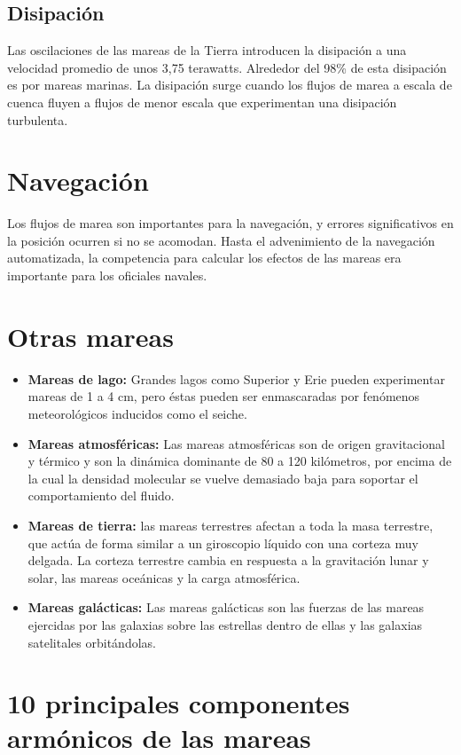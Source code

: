 \documentclass[12pt]{article}
\begin{document}
\begin{doublespace}
\subsection*{Disipación}
Las oscilaciones de las mareas de la Tierra introducen la disipación a una velocidad promedio de unos 3,75 terawatts. Alrededor del 98\% de esta disipación es por mareas marinas. La disipación surge cuando los flujos de marea a escala de cuenca fluyen a flujos de menor escala que experimentan una disipación turbulenta.

\section*{Navegación}
Los flujos de marea son importantes para la navegación, y errores significativos en la posición ocurren si no se acomodan. Hasta el advenimiento de la navegación automatizada, la competencia para calcular los efectos de las mareas era importante para los oficiales navales.

\section*{Otras mareas}
\begin{itemize}
\item \textbf{Mareas de lago:} Grandes lagos como Superior y Erie pueden experimentar mareas de 1 a 4 cm, pero éstas pueden ser enmascaradas por fenómenos meteorológicos inducidos como el seiche.
\item \textbf{Mareas atmosféricas:} Las mareas atmosféricas son de origen gravitacional y térmico y son la dinámica dominante de 80 a 120 kilómetros, por encima de la cual la densidad molecular se vuelve demasiado baja para soportar el comportamiento del fluido.
\item \textbf{Mareas de tierra:} las mareas terrestres afectan a toda la masa terrestre, que actúa de forma similar a un giroscopio líquido con una corteza muy delgada. La corteza terrestre cambia en respuesta a la gravitación lunar y solar, las mareas oceánicas y la carga atmosférica. 
\item \textbf{Mareas galácticas:} Las mareas galácticas son las fuerzas de las mareas ejercidas por las galaxias sobre las estrellas dentro de ellas y las galaxias satelitales orbitándolas.
\end{itemize}

\section*{10 principales componentes armónicos de las mareas}


\end{doublespace}
\end{document}
